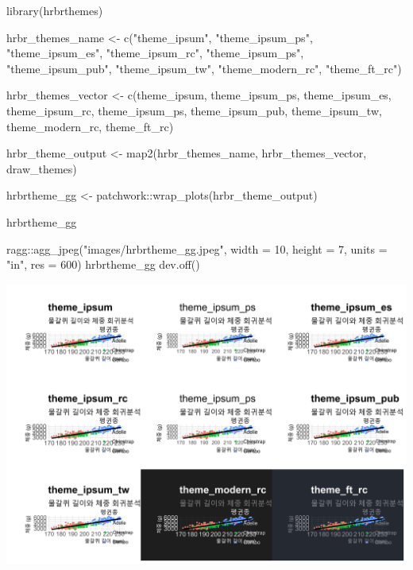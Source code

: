 \documentclass[
  letterpaper,
]{book}
\newenvironment{Shaded}{\begin{snugshade}}{\end{snugshade}}
\newcommand{\AttributeTok}[1]{\textcolor[rgb]{0.40,0.45,0.13}{#1}}
\newcommand{\DecValTok}[1]{\textcolor[rgb]{0.68,0.00,0.00}{#1}}
\newcommand{\FunctionTok}[1]{\textcolor[rgb]{0.28,0.35,0.67}{#1}}
\newcommand{\NormalTok}[1]{\textcolor[rgb]{0.00,0.23,0.31}{#1}}
\newcommand{\OtherTok}[1]{\textcolor[rgb]{0.00,0.23,0.31}{#1}}
\newcommand{\SpecialCharTok}[1]{\textcolor[rgb]{0.37,0.37,0.37}{#1}}
\newcommand{\StringTok}[1]{\textcolor[rgb]{0.13,0.47,0.30}{#1}}
\begin{document}
\begin{Shaded}
\begin{Highlighting}[]
\FunctionTok{library}\NormalTok{(hrbrthemes)}

\NormalTok{hrbr\_themes\_name }\OtherTok{\textless{}{-}} \FunctionTok{c}\NormalTok{(}\StringTok{"theme\_ipsum"}\NormalTok{, }\StringTok{"theme\_ipsum\_ps"}\NormalTok{, }\StringTok{"theme\_ipsum\_es"}\NormalTok{, }\StringTok{"theme\_ipsum\_rc"}\NormalTok{, }\StringTok{"theme\_ipsum\_ps"}\NormalTok{, }\StringTok{"theme\_ipsum\_pub"}\NormalTok{, }\StringTok{"theme\_ipsum\_tw"}\NormalTok{, }\StringTok{"theme\_modern\_rc"}\NormalTok{, }\StringTok{"theme\_ft\_rc"}\NormalTok{)}

\NormalTok{hrbr\_themes\_vector }\OtherTok{\textless{}{-}} \FunctionTok{c}\NormalTok{(theme\_ipsum, theme\_ipsum\_ps, theme\_ipsum\_es, theme\_ipsum\_rc, theme\_ipsum\_ps, theme\_ipsum\_pub, theme\_ipsum\_tw, theme\_modern\_rc, theme\_ft\_rc)}

\NormalTok{hrbr\_theme\_output }\OtherTok{\textless{}{-}} \FunctionTok{map2}\NormalTok{(hrbr\_themes\_name, hrbr\_themes\_vector, draw\_themes)}

\NormalTok{hrbrtheme\_gg }\OtherTok{\textless{}{-}}\NormalTok{ patchwork}\SpecialCharTok{::}\FunctionTok{wrap\_plots}\NormalTok{(hrbr\_theme\_output)}

\NormalTok{hrbrtheme\_gg}

\NormalTok{ragg}\SpecialCharTok{::}\FunctionTok{agg\_jpeg}\NormalTok{(}\StringTok{"images/hrbrtheme\_gg.jpeg"}\NormalTok{,}
               \AttributeTok{width =} \DecValTok{10}\NormalTok{, }\AttributeTok{height =} \DecValTok{7}\NormalTok{, }\AttributeTok{units =} \StringTok{"in"}\NormalTok{, }\AttributeTok{res =} \DecValTok{600}\NormalTok{)}
\NormalTok{hrbrtheme\_gg}
\FunctionTok{dev.off}\NormalTok{()}
\end{Highlighting}
\end{Shaded}

\includegraphics{images/hrbrtheme_gg.jpeg}
\end{document}
